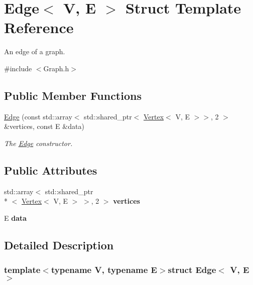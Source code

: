 \hypertarget{struct_edge}{\section{Edge$<$ V, E $>$ Struct Template Reference}
\label{struct_edge}
}


An edge of a graph.  




{\ttfamily \#include $<$Graph.\+h$>$}

\subsection*{Public Member Functions}
\begin{DoxyCompactItemize}
\item 
\hyperlink{struct_edge_acc2c12142d56a68e231fcde33be85e60}{Edge} (const std\+::array$<$ std\+::shared\+\_\+ptr$<$ \hyperlink{struct_vertex}{Vertex}$<$ V, E $>$$>$, 2 $>$ \&vertices, const E \&data)
\begin{DoxyCompactList}\small\item\em The \hyperlink{struct_edge}{Edge} constructor. \end{DoxyCompactList}\end{DoxyCompactItemize}
\subsection*{Public Attributes}
\begin{DoxyCompactItemize}
\item 
\hypertarget{struct_edge_a28150eff12d61e9f9e6618e3aa309091}{std\+::array$<$ std\+::shared\+\_\+ptr\\*
$<$ \hyperlink{struct_vertex}{Vertex}$<$ V, E $>$ $>$, 2 $>$ {\bfseries vertices}}\label{struct_edge_a28150eff12d61e9f9e6618e3aa309091}

\item 
\hypertarget{struct_edge_aa43e5e6cc38bc1e854c8f5f0d9ffe22f}{E {\bfseries data}}\label{struct_edge_aa43e5e6cc38bc1e854c8f5f0d9ffe22f}

\end{DoxyCompactItemize}


\subsection{Detailed Description}
\subsubsection*{template$<$typename V, typename E$>$struct Edge$<$ V, E $>$}

